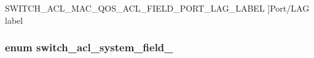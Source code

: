 \begin{Desc}
\begin{description}
{\hypertarget{group__ACL_ggaeab9e985d023f151701d8cca10e0f377af08c0448ccfee3cd2b52fc5890be68c8}{S\+W\+I\+T\+C\+H\+\_\+\+A\+C\+L\+\_\+\+M\+A\+C\+\_\+\+Q\+O\+S\+\_\+\+A\+C\+L\+\_\+\+F\+I\+E\+L\+D\+\_\+\+P\+O\+R\+T\+\_\+\+L\+A\+G\+\_\+\+L\+A\+B\+E\+L}\label{group__ACL_ggaeab9e985d023f151701d8cca10e0f377af08c0448ccfee3cd2b52fc5890be68c8}
}]Port/\+L\+A\+G label \end{description}
\end{Desc}
\hypertarget{group__ACL_ga620cb3ced31cc813578d68b496991f0e}{
\subsubsection[{switch\+\_\+acl\+\_\+system\+\_\+field\+\_\+}]{\setlength{\rightskip}{0pt plus 5cm}enum {\bf switch\+\_\+acl\+\_\+system\+\_\+field\+\_\+}}}\label{group__ACL_ga620cb3ced31cc813578d68b496991f0e}
